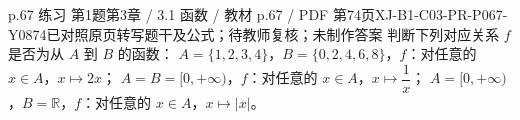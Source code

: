 \par\noindent\begin{minipage}{\linewidth}
\begin{bankitem}{p.67 练习 第1题}{第3章 / 3.1 函数 / 教材 p.67 / PDF 第74页}{XJ-B1-C03-PR-P067-Y0874}{已对照原页转写题干及公式；待教师复核；未制作答案}
判断下列对应关系 $f$ 是否为从 $A$ 到 $B$ 的函数：
$A=\{1,2,3,4\}$，$B=\{0,2,4,6,8\}$，$f$：对任意的 $x\in A$，$x\mapsto2x$；
$A=B=[0,+\infty)$，$f$：对任意的 $x\in A$，$x\mapsto\dfrac1x$；
$A=[0,+\infty)$，$B=\mathbb R$，$f$：对任意的 $x\in A$，$x\mapsto|x|$。
\end{bankitem}
\end{minipage}\par\medskip
